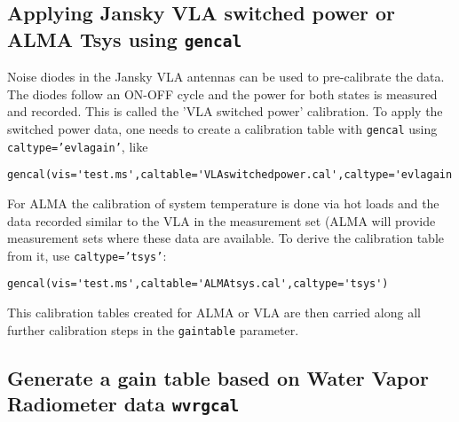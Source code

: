 \subsection{Applying Jansky VLA switched power  or ALMA Tsys
   using {\tt gencal}}
\label{section:cal.prior.gencalevlagains}
Noise diodes in the Jansky VLA antennas can be used to pre-calibrate the
data. The diodes follow an ON-OFF cycle and the power for both states is
measured and recorded. This is called the 'VLA switched power'
calibration.  To apply the switched power data, one needs to 
create a calibration table with {\tt gencal} using {\tt
  caltype='evlagain'}, like 

\small
\begin{verbatim}
gencal(vis='test.ms',caltable='VLAswitchedpower.cal',caltype='evlagain')
\end{verbatim}
\normalsize

For ALMA the calibration of system temperature is done via hot loads
and the data recorded similar to the VLA in the measurement set (ALMA
will provide measurement sets where these data are available. To
derive the calibration table from it, use {\tt caltype='tsys'}:

\small
\begin{verbatim}
gencal(vis='test.ms',caltable='ALMAtsys.cal',caltype='tsys')
\end{verbatim}
\normalsize


This calibration tables created for ALMA or VLA are then carried
along all further calibration steps in the {\tt gaintable} parameter.

\subsection{ Generate a gain table based on Water Vapor Radiometer data {\tt wvrgcal}}
\label{section:cal.prior.wvrgcal}

